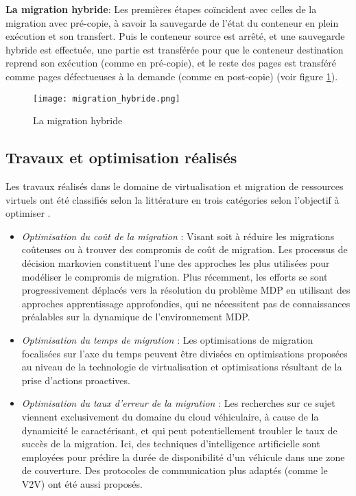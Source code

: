 \textbf{La migration hybride}: Les premières étapes coïncident avec celles de la migration avec pré-copie, à savoir la sauvegarde de l'état du conteneur en plein exécution et son transfert. Puis le conteneur source est arrêté, et une sauvegarde hybride est effectuée, une partie est transférée pour que le conteneur destination reprend son exécution (comme en pré-copie), et le reste des pages est transféré comme pages défectueuses à la demande (comme en post-copie) (voir figure \ref{fig:migration_hybride}).
\begin{figure}[H]
\centering
\texttt{[image: migration\_hybride.png]}
\caption{La migration hybride \cite{puliafito2019}}
\label{fig:migration_hybride}
\end{figure}

\subsection{Travaux et optimisation réalisés}
Les travaux réalisés dans le domaine de virtualisation et migration de ressources virtuels ont été classifiés selon la littérature en trois catégories selon l'objectif à optimiser \cite{rejiba2019}.
\begin{itemize}
  \item \emph{Optimisation du coût de la migration} : Visant soit à réduire les migrations coûteuses ou à trouver des compromis de coût de migration. Les processus de décision markovien constituent l'une des approches les plus utilisées pour modéliser le compromis de migration. Plus récemment, les efforts se sont progressivement déplacés vers la résolution du problème MDP en utilisant des approches apprentissage approfondies, qui ne nécessitent pas de connaissances préalables sur la dynamique de l'environnement MDP.
  \item \emph{Optimisation du temps de migration} : Les optimisations de migration focalisées sur l'axe du temps peuvent être divisées en optimisations proposées au niveau de la technologie de virtualisation et optimisations résultant de la prise d'actions proactives.
  \item \emph{Optimisation du taux d'erreur de la migration} : Les recherches sur ce sujet viennent exclusivement du domaine du cloud véhiculaire, à cause de la dynamicité le caractérisant, et qui peut potentiellement troubler le taux de succès de la migration. Ici, des techniques d'intelligence artificielle sont employées pour prédire la durée de disponibilité d'un véhicule dans une zone de couverture. Des protocoles de communication plus adaptés (comme le V2V) ont été aussi proposés.
\end{itemize}
